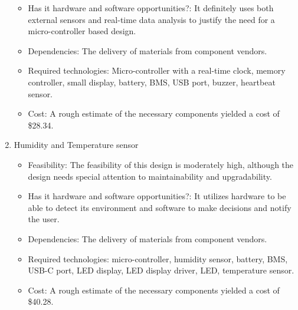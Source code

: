 \begin{enumerate}
\begin{itemize}
          \item Has it hardware and software opportunities?: It definitely uses both external sensors and real-time data analysis to justify the need for a micro-controller based design.
          \item Dependencies: The delivery of materials from component vendors.
          \item Required technologies: Micro-controller with a real-time clock, memory controller, small display, battery, BMS, USB port, buzzer, heartbeat sensor.
          \item Cost: A rough estimate of the necessary components yielded a cost of \$28.34.
        \end{itemize}
        \item Humidity and Temperature sensor
        \begin{itemize}
          \item Feasibility: The feasibility of this design is moderately high, although the design needs special attention to maintainability and upgradability.
          \item Has it hardware and software opportunities?: It utilizes hardware to be able to detect its environment and software to make decisions and notify the user.
          \item Dependencies: The delivery of materials from component vendors.
          \item Required technologies: micro-controller, humidity sensor, battery, BMS, USB-C port, LED display, LED display driver, LED, temperature sensor.
          \item Cost: A rough estimate of the necessary components yielded a cost of \$40.28.
        \end{itemize}
\end{enumerate}
